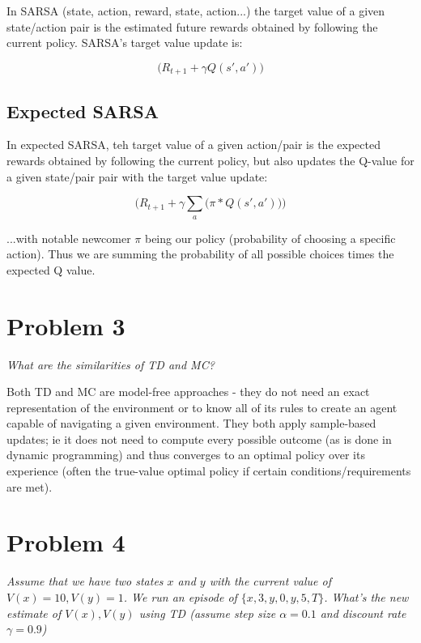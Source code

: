\documentclass{article}
\begin{document}
In SARSA (state, action, reward, state, action...) the target value of a given state/action pair is the estimated future rewards obtained by following the current policy. SARSA's target value update is:

\begin{equation}
    \biggl( R_{t+1} + \gamma Q(s',a')\biggr)
\end{equation}

\subsection*{Expected SARSA}

In expected SARSA, teh target value of a given action/pair is the expected rewards  obtained by following the current policy, but also updates the Q-value for a given state/pair pair with the target value update:

\begin{equation}
    \biggl( R_{t+1} + \gamma \sum_a \bigl( \pi * Q(s',a') \bigr) \biggr)
\end{equation}

\noindent ...with notable newcomer $\pi$ being our policy (probability of choosing a specific action). Thus we are summing the probability of all possible choices times the expected Q value.


\section*{Problem 3}
\textit{What are the similarities of TD and MC?}

Both TD and MC are model-free approaches - they do not need an exact representation of the environment or to know all of its rules to create an agent capable of navigating a given environment. They both apply sample-based updates; ie it does not need to compute every possible outcome (as is done in dynamic programming) and thus converges to an optimal policy over its experience (often the true-value optimal policy if certain conditions/requirements are met).

\section*{Problem 4}
\textit{Assume that we have two states $x$ and $y$ with the current value of $V(x)=10, V(y)=1$. We run an episode of $\{ x, 3, y, 0, y, 5, T \}$. What’s the new estimate of $V(x),V(y)$ using TD (assume step size $\alpha = 0.1$ and discount rate $\gamma = 0.9$)}
\end{document}

